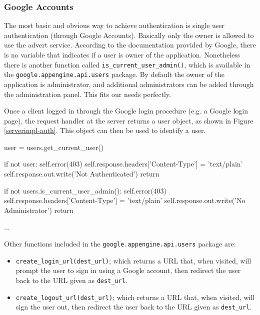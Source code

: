 \subsubsection{Google Accounts}
The most basic and obvious way to achieve authentication is single user
authentication (through Google Accounts). Basically only the owner is allowed to
use the advert service. According to the documentation provided by Google, there
is no variable that indicates if a user is owner of the application. Nonetheless
there is another function called \texttt{is\_current\_user\_admin()}, which is
available in the \texttt{google.appengine.api.users} package. By default the
owner of the application is administrator, and additional administrators can be
added through the administration panel. This fits our needs perfectly.

Once a client logged in through the Google login procedure (e.g. a Google login
page), the request handler at the server returns a user object, as shown in
Figure \ref{serverimpl-auth}. This object can then be used to identify a
user.

\begin{figure*}[ht] %
\begin{center}
\begin{code}
user   = users.get_current_user()

if not user:
    self.error(403)
    self.response.headers['Content-Type'] = 'text/plain'
    self.response.out.write('Not Authenticated')
    return

if not users.is_current_user_admin():
    self.error(403)
    self.response.headers['Content-Type'] = 'text/plain'
    self.response.out.write('No Administrator')
    return
    
...
\end{code}
\caption{Authenticating a User.\label{serverimpl-auth}}
\end{center}
\end{figure*}

Other functions included in the \texttt{google.appengine.api.users} package are:

\begin{itemize} 
\item \texttt{create\_login\_url(dest\_url)}; which returns a URL that, when
visited, will prompt the user to sign in using a Google account, then redirect
the user back to the URL given as \texttt{dest\_url}.
\item \texttt{create\_logout\_url(dest\_url)}; which returns a URL that, when
visited, will sign the user out, then redirect the user back to the URL given as
\texttt{dest\_url}.
\end{itemize}

